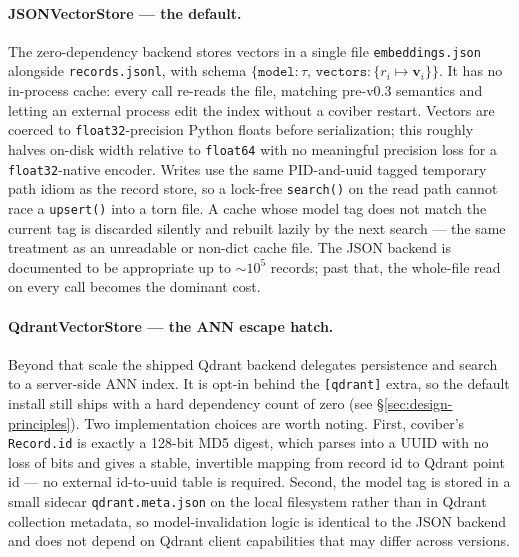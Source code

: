 \paragraph{JSONVectorStore --- the default.}
The zero-dependency backend stores vectors in a single file
\texttt{embeddings.json} alongside \texttt{records.jsonl}, with
schema $\{\texttt{model}: \tau,\, \texttt{vectors}: \{r_i \mapsto \mathbf{v}_i\}\}$.
It has no in-process cache: every call re-reads the file, matching
pre-v0.3 semantics and letting an external process edit the index
without a coviber restart. Vectors are coerced to
\texttt{float32}-precision Python floats before serialization; this
roughly halves on-disk width relative to \texttt{float64} with no
meaningful precision loss for a \texttt{float32}-native encoder. Writes
use the same PID\hyp{}and\hyp{}uuid tagged temporary path idiom as the
record store, so a lock-free \texttt{search()} on the read path cannot
race a \texttt{upsert()} into a torn file. A cache whose model tag
does not match the current tag is discarded silently and rebuilt
lazily by the next search — the same treatment as an unreadable or
non-dict cache file. The JSON backend is documented to be appropriate
up to $\sim 10^{5}$ records; past that, the whole-file read on every
call becomes the dominant cost.

\paragraph{QdrantVectorStore --- the ANN escape hatch.}
Beyond that scale the shipped Qdrant\cite{TODO-qdrant} backend
delegates persistence and search to a server-side ANN index. It is
opt-in behind the \texttt{[qdrant]} extra, so the default install
still ships with a hard dependency count of zero (see
\S\ref{sec:design-principles}). Two implementation choices are worth
noting. First, coviber's \texttt{Record.id} is exactly a 128-bit MD5
digest, which parses into a UUID with no loss of bits and gives a
stable, invertible mapping from record id to Qdrant point id — no
external id-to-uuid table is required. Second, the model tag is
stored in a small sidecar \texttt{qdrant.meta.json} on the local
filesystem rather than in Qdrant collection metadata, so
model-invalidation logic is identical to the JSON backend and does not
depend on Qdrant client capabilities that may differ across versions.

